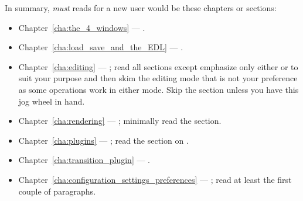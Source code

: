 In summary, \textit{must} reads for a new user would be these chapters or sections:

\begin{itemize}
    \item Chapter~\ref{cha:the_4_windows} --- .
    \item Chapter~\ref{cha:load_save_and_the_EDL} --- .
    \item Chapter~\ref{cha:editing} --- ; read all sections except emphasize only either  or  to suit your purpose and then skim the editing mode that is not your preference as some operations work in either mode.
        Skip the  section unless you have this jog wheel in hand.
    \item Chapter~\ref{cha:rendering} --- ; minimally read the  section.
    \item Chapter~\ref{cha:plugins} --- ; read the section on .
    \item Chapter~\ref{cha:transition_plugin} --- .
    \item Chapter~\ref{cha:configuration_settings_preferences} --- ; read at least the first couple of paragraphs.
\end{itemize}

